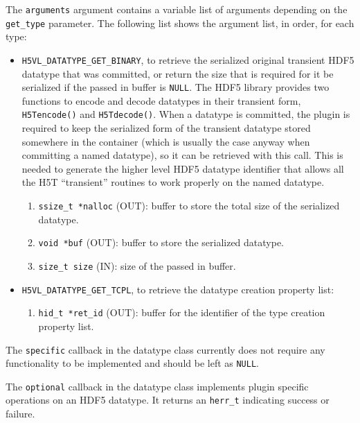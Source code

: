 The \texttt{arguments} argument contains a variable list of arguments
depending on the \texttt{get\_type} parameter. The following list shows
the argument list, in order, for each type:

\begin{itemize}
\item \texttt{H5VL\_DATATYPE\_GET\_BINARY}, to retrieve the serialized original transient HDF5 datatype that was committed, or
return the size that is required for it be serialized if the passed in buffer is \texttt{NULL}. The HDF5 library provides two functions to
encode and decode datatypes in their transient form, \texttt{H5Tencode()} and \texttt{H5Tdecode()}. When a datatype is committed, the plugin is required to keep the serialized form of the transient datatype stored somewhere in the container (which is usually the case anyway when committing a named datatype), so it can be retrieved with this call. This is needed to generate the higher level HDF5 datatype identifier that allows all the H5T ``transient'' routines to work properly on the named datatype.
  \begin{enumerate}
  \item \texttt{ssize\_t *nalloc} (OUT): buffer to store the total size of the serialized datatype.
  \item \texttt{void *buf} (OUT): buffer to store the serialized datatype.
  \item \texttt{size\_t size} (IN): size of the passed in buffer.
  \end{enumerate}
  
\item \texttt{H5VL\_DATATYPE\_GET\_TCPL}, to retrieve the datatype
  creation property list:
  \begin{enumerate}
  \item \texttt{hid\_t *ret\_id} (OUT): buffer for the identifier of the
    type creation property list.
  \end{enumerate}
\end{itemize}

The \texttt{specific} callback in the datatype class currently does not require any functionality to be implemented and should be left as \texttt{NULL}.

The \texttt{optional} callback in the datatype class implements plugin specific operations on an HDF5 datatype. It returns an \texttt{herr\_t} indicating success or failure.\bigskip 

